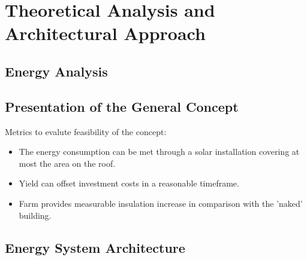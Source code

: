 \chapter{Theoretical Analysis and Architectural Approach}
\label{chap:analysis-and-arch}
%
\section{Energy Analysis}
\section{Presentation of the General Concept}
Metrics to evalute feasibility of the concept:
\begin{itemize}
	\item The energy consumption can be met through a solar installation covering at most the area on the roof.
	\item Yield can offset investment costs in a reasonable timeframe.
	\item Farm provides measurable insulation increase in comparison with the 'naked' building.
\end{itemize}

\section{Energy System Architecture}
